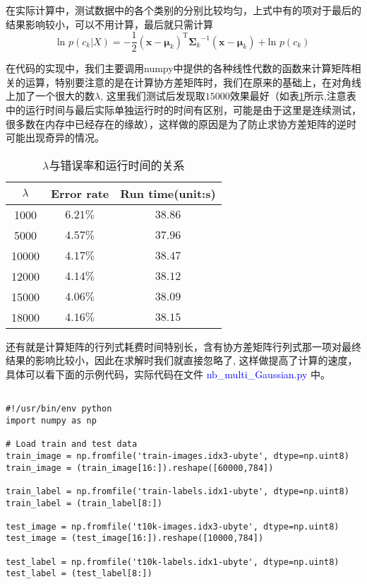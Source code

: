 \documentclass[a4paper, 1pt]{article}
\begin{document}
\begin{spacing}{1.2}
在实际计算中，测试数据中的各个类别的分别比较均匀，上式中有的项对于最后的结果影响较小，可以不用计算，最后就只需计算
$$
\text{ln }p(c_k|X)=-\frac{1}{2}({\mathbf x}-{\boldsymbol\mu_k})^\mathrm{T}{\boldsymbol\Sigma_k}^{-1}({\mathbf x}-{\boldsymbol\mu_k}) + \text{ln }p(c_k)
$$

在代码的实现中，我们主要调用numpy中提供的各种线性代数的函数来计算矩阵相关的运算，特别要注意的是在计算协方差矩阵时，我们在原来的基础上，在对角线上加了一个很大的数$\lambda$, 这里我们测试后发现取$15000$效果最好（如表\ref{tab_lambda}所示,注意表中的运行时间与最后实际单独运行时的时间有区别，可能是由于这里是连续测试，很多数在内存中已经存在的缘故），这样做的原因是为了防止求协方差矩阵的逆时可能出现奇异的情况。
\begin{table}[htbp]
\caption{$\lambda$与错误率和运行时间的关系\label{tab_lambda}}
\centering
\begin{tabular}{ccc}
\toprule
$\lambda$ & Error rate & Run time(unit:s)\\
\midrule
1000 & $6.21\%$  & $38.86$ \\
5000 & $4.57\%$  & $37.96$ \\
10000 & $4.17\%$  & $38.47$ \\
12000 & $4.14\%$  & $38.12$ \\
15000 & $4.06\%$  & $38.09$ \\
18000 & $4.16\%$  & $38.15$ \\
\bottomrule
\end{tabular}
\end{table}

还有就是计算矩阵的行列式耗费时间特别长，含有协方差矩阵行列式那一项对最终结果的影响比较小，因此在求解时我们就直接忽略了, 这样做提高了计算的速度，具体可以看下面的示例代码，实际代码在文件 \textcolor{blue}{ nb\_multi\_Gaussian.py} 中。
\begin{lstlisting}

#!/usr/bin/env python
import numpy as np

# Load train and test data
train_image = np.fromfile('train-images.idx3-ubyte', dtype=np.uint8)
train_image = (train_image[16:]).reshape([60000,784])

train_label = np.fromfile('train-labels.idx1-ubyte', dtype=np.uint8)
train_label = (train_label[8:])

test_image = np.fromfile('t10k-images.idx3-ubyte', dtype=np.uint8)
test_image = (test_image[16:]).reshape([10000,784])

test_label = np.fromfile('t10k-labels.idx1-ubyte', dtype=np.uint8)
test_label = (test_label[8:])


\end{lstlisting}
\end{spacing}
\end{document}
